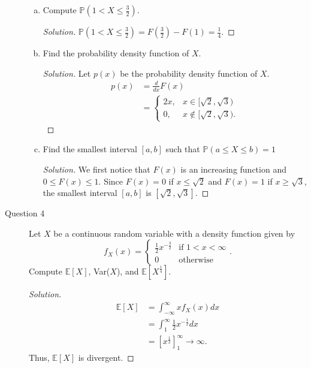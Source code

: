 \documentclass[addpoints, 11pt]{exam}
\newcommand*{\p}{\mathds{P}}
\newcommand*{\E}{\mathds{E}}
\begin{document}
\begin{description}
\begin{enumerate}[(a)]
        \item Compute $\p(1 < X \leq \frac{3}{2})$.
        \begin{proof}[Solution]
            $\p(1 < X \leq \frac{3}{2}) = F(\frac{3}{2}) - F(1) = \frac{1}{4}$.
        \end{proof}

        \item Find the probability density function of $X$.
        \begin{proof}[Solution]
        Let $p(x)$ be the probability density function of $X$.
            \begin{align*}
                p(x) 
                &= \frac{d}{dx}F(x) \\
                &= \begin{cases}
                    2x, & x \in [\sqrt{2}, \sqrt{3}) \\
                    0, & x \notin [\sqrt{2}, \sqrt{3}).
                \end{cases}
            \end{align*}
        \end{proof}

        \item Find the smallest interval $[a, b]$ such that $\p(a \leq X \leq b) = 1$
        \begin{proof}[Solution]
            We first notice that $F(x)$ is an increasing function and $0 \leq F(x) \leq 1$. Since $F(x) = 0$ if $x \leq \sqrt{2}$ and $F(x) = 1$ if $x \geq \sqrt{3}$, the smallest interval $[a, b]$ is $[\sqrt{2}, \sqrt{3}]$.
        \end{proof}
    \end{enumerate}

    \newpage

    \item[Question 4] Let $X$ be a continuous random variable with a density function given by
    \[
        f_X(x) = \begin{cases}
            \frac{1}{2}x^{-\frac{3}{2}} &\text{if }1 < x < \infty \\
            0 & \text{otherwise}
        \end{cases}.
    \]
    Compute $\E[X]$, Var($X$), and $\E[X^{\frac{1}{4}}]$.

    \begin{proof}[Solution]
        \begin{align*}
            \E[X]
            &= \int^{\infty}_{-\infty} xf_X(x) dx \\
            &= \int^{\infty}_1 \frac{1}{2}x^{-\frac{1}{2}} dx \\
            &= \left[x^{\frac{1}{2}}\right]^{\infty}_1 \rightarrow \infty.
        \end{align*}
        Thus, $\E[X]$ is divergent.


\end{proof}
\end{description}
\end{document}
